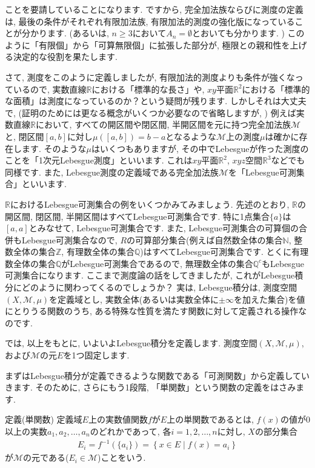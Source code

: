 ことを要請していることになります. ですから, 完全加法族ならびに測度の定義は, 最後の条件がそれぞれ有限加法族, 有限加法的測度の強化版になっていることが分かります. (あるいは, $n\ge3$において$A_{n}=\emptyset$とおいても分かります. ) このように「有限個」から「可算無限個」に拡張した部分が, 極限との親和性を上げる決定的な役割を果たします. 
\par さて, 測度をこのように定義しましたが, 有限加法的測度よりも条件が強くなっているので, 実数直線$\mathbb{R}$における「標準的な長さ」や, $xy$平面$\mathbb{R}^2$における「標準的な面積」は測度になっているのか？という疑問が残ります. しかしそれは大丈夫で, (証明のためには更なる概念がいくつか必要なので省略しますが, ) 例えば実数直線$\mathbb{R}$において, すべての開区間や閉区間, 半開区間を元に持つ完全加法族$\mathcal{M}$と, 閉区間$[a,b]$に対し$\mu\left([a,b]\right)=b-a$となるような$\mathcal{M}$上の測度$\mu$は確かに存在します. そのような$\mu$はいくつもありますが, その中でLebesgueが作った測度のことを「1次元Lebesgue測度」といいます. これは$xy$平面$\mathbb{R}^2$, $xyz$空間$\mathbb{R}^3$などでも同様です. また, Lebesgue測度の定義域である完全加法族$\mathcal{M}$を「Lebesgue可測集合」といいます. 
\par $\mathbb{R}$におけるLebesgue可測集合の例をいくつかみてみましょう. 先述のとおり, $\mathbb{R}$の開区間, 閉区間, 半開区間はすべてLebesgue可測集合です. 特に1点集合$\{a\}$は$[a,a]$とみなせて, Lebesgue可測集合です. また, Lebesgue可測集合の可算個の合併もLebesgue可測集合なので, $R$の可算部分集合(例えば自然数全体の集合$\mathbb{N}$, 整数全体の集合$\mathbb{Z}$, 有理数全体の集合$\mathbb{Q}$)はすべてLebesgue可測集合です. とくに有理数全体の集合$\mathbb{Q}$がLebesgue可測集合であるので, 無理数全体の集合$\mathbb{Q}^c$もLebesgue可測集合になります.  
ここまで測度論の話をしてきましたが, これがLebesgue積分にどのように関わってくるのでしょうか？ 実は, Lebesgue積分は, 測度空間$(X,\mathcal{M},\mu)$を定義域とし, 実数全体(あるいは実数全体に$\pm\infty$を加えた集合)を値にとりうる関数のうち, ある特殊な性質を満たす関数に対して定義される操作なのです. 
\par では, 以上をもとに, いよいよLebesgue積分を定義します. 測度空間$(X,\mathcal{M},\mu)$, および$\mathcal{M}$の元$E$を1つ固定します.
\par まずはLebesgue積分が定義できるような関数である「可測関数」から定義していきます. そのために, さらにもう1段階, 「単関数」という関数の定義をはさみます. 
\begin{itembox}[l]{定義(単関数)}
定義域$E$上の実数値関数$f$が$E$上の単関数であるとは, $f(x)$の値が0以上の実数$a_1, a_2, \ldots, a_n$のどれかであって, 各$i=1,2,\ldots,n$に対し, $X$の部分集合
\begin{eqnarray}
E_i=f^{-1}\left(\{ a_i\}\right)=\left\{x\in E\mid f(x)=a_i \right\} \nonumber
\end{eqnarray}
が$\mathcal{M}$の元である($E_i\in\mathcal{M}$)ことをいう. 
\end{itembox}
